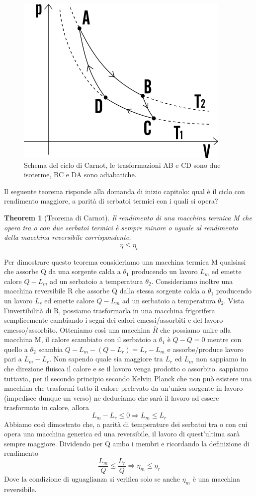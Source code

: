\documentclass[10pt,a4paper]{article}
\newtheorem{theorem}{Theorem}
\begin{document}
\begin{figure}[h!]
	\centering
	\includegraphics[width=0.5\linewidth]{../images/ciclo_carnot}
	\caption{Schema del ciclo di Carnot, le trasformazioni AB e CD sono due isoterme, BC e DA sono adiabatiche.}
	\label{fig:ciclocarnot}
\end{figure}
\FloatBarrier
Il seguente teorema risponde alla domanda di inizio capitolo: qual è il ciclo con rendimento maggiore, a parità di serbatoi termici con i quali si opera? 
\begin{theorem}[Teorema di Carnot]
	Il rendimento di una macchina termica M che opera tra o con due serbatoi termici è sempre minore o uguale al rendimento della macchina reversibile corrispondente.
	\[\eta \leq \eta_c\]
\end{theorem}
Per dimostrare questo teorema consideriamo una macchina termica M qualsiasi che assorbe Q da una sorgente calda a $\theta_1$ producendo un lavoro $L_m$ ed emette calore $Q-L_m$ ad un serbatoio a temperatura $\theta_2$. Consideriamo inoltre una macchina reversibile R che assorbe Q dalla stessa sorgente calda a $\theta_1$ producendo un lavoro $L_r$ ed emette calore $Q-L_m$ ad un serbatoio a temperatura $\theta_2$. Vista l'invertibilità di R, possiamo trasformarla in una macchina frigorifera semplicemente cambiando i segni dei calori emessi/assorbiti e del lavoro emesso/assorbito. Otteniamo così una macchina $\overline{R}$ che possiamo unire alla macchina M, il calore scambiato con il serbatoio a $\theta_1$ è \(Q-Q = 0\) mentre con quello a $\theta_2$ scambia \(Q-L_m - (Q-L_r) = L_r-L_m\) e assorbe/produce lavoro pari a \(L_m-L_r\). Non sapendo quale sia maggiore tra \(L_r\) ed \(L_m\) non sappiamo in che direzione fluisca il calore e se il lavoro venga prodotto o assorbito. sappiamo tuttavia, per il secondo principio secondo Kelvin Planck che non può esistere una macchina che trasformi tutto il calore prelevato da un'unica sorgente in lavoro (impedisce dunque un verso) ne deduciamo che sarà il lavoro ad essere trasformato in calore, allora \[L_m-L_r \leq 0 \Rightarrow L_m \leq L_r\] Abbiamo così dimostrato che, a parità di temperature dei serbatoi tra o con cui opera una macchina generica ed una reversibile, il lavoro di quest'ultima sarà sempre maggiore. Dividendo per Q ambo i membri e ricordando la definizione di rendimento
\[\frac{L_m }{Q} \leq \frac{L_r}{Q} \Rightarrow \eta_m \leq \eta_r\]
Dove la condizione di uguaglianza si verifica solo se anche $\eta_m$ è una macchina reversibile. 
\end{document}
